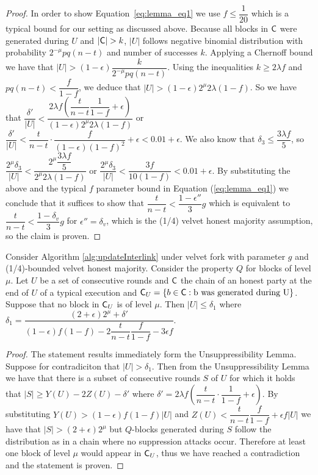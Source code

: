 \begin{proof}
In order to show Equation~\ref{eq:lemma_eq1} we use $f \leq \dfrac{1}{20}$ which is a typical bound for our setting as discussed above.
Because all blocks in $\mathsf{C}$ were generated during $U$ and $\lvert \mathsf{C} \rvert > k $, $\lvert U \rvert$ follows negative binomial distribution with probability $2^{-\mu} pq(n-t)$ and number of successes $k$.
Applying a Chernoff bound we have that $\lvert U \rvert > (1-\epsilon) \dfrac{k}{2^{-\mu} pq(n-t)}$. Using the inequalities $k \geq 2\lambda f$ and $pq(n-t) < \dfrac{f}{1-f}$, we deduce that $\lvert U \rvert > (1-\epsilon) 2^{\mu}2\lambda(1-f)$. So we have that $\dfrac{\delta'}{\lvert U \rvert} < \dfrac{2\lambda f (\dfrac{t}{n-t} \dfrac{1}{1-f} + \epsilon)}{(1-\epsilon)2^{\mu}2\lambda (1-f)}$ or $\dfrac{\delta'}{\lvert U \rvert} < \dfrac{t}{n-t} \cdot \dfrac{f}{(1-\epsilon)(1-f)^2} + \epsilon < 0.01 + \epsilon$.
We also know that $\delta_3 \leq \dfrac{ 3\lambda f}{5}$, so
$\dfrac{2^{\mu} \delta_3}{\lvert U \rvert} < \dfrac{2^\mu \dfrac{ 3\lambda f}{5}}{2^{\mu} 2 \lambda (1-f)}$ or
$\dfrac{2^{\mu} \delta_3}{\lvert U \rvert} < \dfrac{3f}{10(1-f)} < 0.01 + \epsilon$.
By substituting the above and the typical $f$ parameter bound in Equation (\ref{eq:lemma_eq1}) we conclude that it suffices to show that $\dfrac{t}{n-t} < \dfrac{1-\epsilon''}{3}g$
which is equivalent to $\dfrac{t}{n-t} < \dfrac{1-\delta_v}{3}g$ for $\epsilon'' = \delta_v$, which is the (1/4) velvet honest majority assumption, so the claim is proven.
\end{proof}

\begin{lemma}\label{lem:claim1_lemma}
    Consider Algorithm \ref{alg:updateInterlink} under velvet fork with parameter $g$ and (1/4)-bounded velvet honest majority. Consider the  property $Q$ for blocks of level $\mu$. Let $U$ be a set of consecutive rounds and $\mathsf{C}$ the chain of an honest party at the end of $U$ of a typical execution and $\mathsf{C}_U = \{ b \in \mathsf{C}: \text{b was generated during U} \}$. Suppose that no block in $\mathsf{C}_U$ is of level $\mu$. Then $\lvert U \rvert \leq \delta_1$ where
    $\delta_1 = \dfrac{(2+\epsilon) 2^{\mu} + \delta'}{(1-\epsilon)f(1-f) - 2\dfrac{t}{n-t}\dfrac{f}{1-f} -3\epsilon f}$.
\end{lemma}
\begin{proof}
    The statement results immediately form the Unsuppressibility Lemma. Suppose for contradiciton that $\lvert U \rvert > \delta_1 $.
    Then from the Unsuppressibility Lemma we have that there is a subset of consecutive rounds $S$ of $U$ for which it holds that
    $\lvert S \rvert \geq Y(U) - 2Z(U) - \delta'$ where
    $\delta' = 2 \lambda f (\dfrac{t}{n-t} \cdot \dfrac{1}{1-f} + \epsilon)$. By substituting
    $Y(U) > (1-\epsilon)f(1-f) \lvert U \rvert$ and
    $Z(U) < \dfrac{t}{n-t} \dfrac{f}{1-f} +\epsilon f \lvert U \rvert$ we have that $\lvert S \rvert > (2+\epsilon)2^{\mu}$ but $Q$-blocks generated during $S$ follow the distribution as in a chain where no suppression attacks occur. Therefore at least one block of level $\mu$ would appear in $\mathsf{C}_U$, thus we have reached a contradiction and the statement is proven.
\end{proof}

